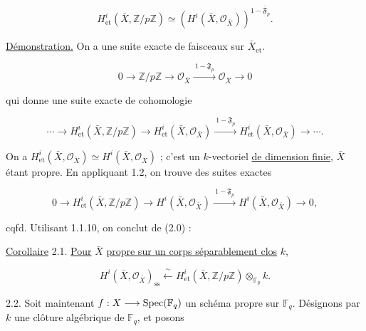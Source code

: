 \begin{equation}\tag{2.0.3}
H^i_{\mathrm{et}}(\bar X,\mathbb Z/p\mathbb Z)
\simeq
(H^i(\bar X,\mathcal O_{\bar X}))^{1-\overline{\mathfrak F}_p}.
\end{equation}

\underline{Démonstration.} On a une suite exacte de faisceaux sur
$\bar X_{\mathrm{et}}$.

\begin{equation}\tag{2.0.4}
0\longrightarrow\mathbb Z/p\mathbb Z\longrightarrow\mathcal O_{\bar X}
\xrightarrow{\ 1-\mathfrak F_p\ }\mathcal O_{\bar X}\longrightarrow0
\end{equation}

qui donne une suite exacte de cohomologie

\begin{equation}\tag{2.0.5}
\cdots\longrightarrow H^i_{\mathrm{et}}(\bar X,\mathbb Z/p\mathbb Z)
\longrightarrow H^i_{\mathrm{et}}(\bar X,\mathcal O_{\bar X})
\xrightarrow{\ 1-\mathfrak F_p\ }
H^i_{\mathrm{et}}(\bar X,\mathcal O_{\bar X})\longrightarrow\cdots .
\end{equation}

On a
$H^i_{\mathrm{et}}(\bar X,\mathcal O_{\bar X})\simeq
H^i(\bar X,\mathcal O_{\bar X})$ ; c'est un $k$-vectoriel \underline{de dimension finie},
$\bar X$ étant propre. En appliquant 1.2, on trouve des suites exactes


\begin{equation}\tag{2.0.6}
0\longrightarrow H^i_{\mathrm{et}}(\bar X,\mathbb Z/p\mathbb Z)
\longrightarrow H^i(\bar X,\mathcal O_{\bar X})
\xrightarrow{\ 1-\mathfrak F_p\ }
H^i(\bar X,\mathcal O_{\bar X})\longrightarrow0,
\end{equation}

cqfd. Utilisant 1.1.10, on conclut de (2.0) :

\underline{Corollaire} 2.1. \underline{Pour} $\bar X$ \underline{propre sur un corps
séparablement clos} $k$,

\begin{equation}\tag{2.1.1}
H^i(\bar X,\mathcal O_{\bar X})_{\mathrm{ss}}
\xleftarrow{\ \sim\ }
H^i_{\mathrm{et}}(\bar X,\mathbb Z/p\mathbb Z)
\otimes_{\mathbb F_p}k.
\end{equation}

2.2. Soit maintenant $f:X\longrightarrow\operatorname{Spec}(\mathbb F_q)$ un schéma
propre sur $\mathbb F_q$. Désignons par $k$ une clôture algébrique de
$\mathbb F_q$, et posons


